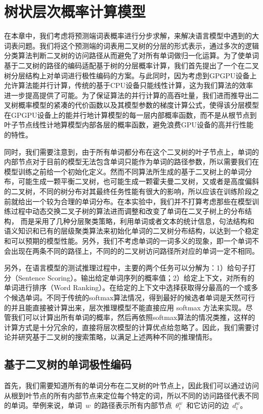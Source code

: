 \chapter{树状层次概率计算模型}
在本章中，我们考虑将预测端词表概率进行分步求解，来解决语言模型中遇到的大词表问题。我们将这个预测端的词表用二叉树的分层的形式表示，通过多次的逻辑分类算法判断二叉树的访问路径从而避免了对所有单词做归一化运算。为了使单词基于二叉树的路径的编码适配基于树的分层概率计算，我们首先提出了一个在二叉树分层结构上对单词进行极性编码的方案。与此同时，因为考虑到GPGPU设备上允许算法能并行计算，传统的基于CPU设备只能线性计算，这为我们算法的效率进一步提高提供了可能。为了保证算法的并行计算的高吞吐量，我们进而推导出二叉树概率模型的紧凑的代价函数以及其模型参数的梯度计算公式，使得该分层模型在GPGPU设备上的能并行地计算模型的每一层内部概率函数，而不是从根节点到叶子节点线性计地算模型内部各层的概率函数，避免浪费GPU设备的高并行性能的特性。

同时，我们需要注意到，由于所有单词都分布在这个二叉树的叶子节点上，单词的内部节点对于目前的模型无法包含单词只能作为单词的路径参数，所以需要我们在模型训练之前给一个初始化定义。然而不同算法所生成的基于二叉树上的单词分布，可能生成一颗平衡二叉树，也可能生成一颗霍夫曼二叉树，又或者是高度偏斜的二叉树，不同的树分布对其最终任务性能有很大的影响，所以应该在训练阶段之前就给出一个较为合理的单词分布。在本实验中，我们并不打算考虑那些在模型训练过程中动态交换二叉子树的算法进而调整和改变了单词在二叉子树上的分布结构， 而是采用了几种分层聚类策略，利用单词或者文本的统计信息，句法结构和语义知识和已有的层级聚类算法来初始化单词的二叉树分布结构，以达到一个稳定和可以预期的模型性能。另外，我们不考虑单词的一词多义的现象，即一个单词不会出现在两条不同的路径上，不同的的二叉树访问路径所对应的单词一定不相同。

另外，在语言模型的测试推理过程中，主要的两个任务可以分解为：1）给句子打分（Sentence Scoring）。输出给定单词序列的概率值；2）给定上下文，对所有的单词进行排序（Word Ranking）。在给定的上下文中选择获取得分最高的一个或多个候选单词。不同于传统的softmax算法情况，得到最好的候选者单词是天然可行的并且能直接被计算出来，层次推理模型不能直接应用 softmax 方法来实现。尽管我们可以计算出所有单词的概率，然后再依照softmax算法的情况类推，这样的计算方式是十分冗余的，直接将层次模型的计算优点给忽略了。因此，我们需要讨论并研究基于二叉树的搜索策略，以满足上述两种不同的推理情形。
\section{基于二叉树的单词极性编码}
首先，我们需要知道所有的单词分布在二叉树的叶节点上，因此我们可以通过访问从根到叶节点的所有内部节点来定位每个特定的词，所以不同的访问路径代表不同的单词。举例来说，单词~$w$~的路径表示所有内部节点~$\theta^w_i$~和它访问的边~$d^w_i$。

